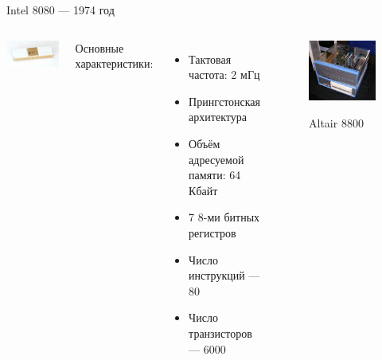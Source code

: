 \documentclass{beamer}
\begin{document}
    \begin{frame}{Intel 8080 --- 1974 год}
    \begin{columns}
    	\includegraphics[width=0.8\linewidth]{fig/Intel_8080.jpg}
    	\footnotesize

    	Основные характеристики:
    	\begin{itemize}
    		\item Тактовая частота: 2 мГц
    		\item Прингстонская архитектура
    		\item Объём адресуемой памяти: 64 Кбайт
    		\item 7 8-ми битных регистров
    		\item Число инструкций --- 80
       		\item Число транзисторов --- 6000  
    	\end{itemize}
    	\begin{figure}
    		\includegraphics[width=\linewidth]{fig/Altair_8800.jpg}

    		Altair 8800
    	\end{figure}
    \end{columns}
    \end{frame}
\end{document}
